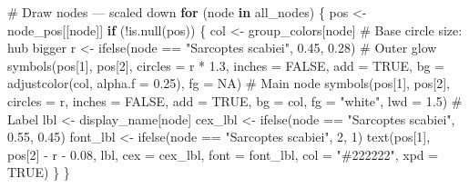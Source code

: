 \documentclass[
  letterpaper,
  DIV=11,
  numbers=noendperiod]{scrartcl}
\newenvironment{Shaded}{\begin{snugshade}}{\end{snugshade}}
\newcommand{\AttributeTok}[1]{\textcolor[rgb]{0.40,0.45,0.13}{#1}}
\newcommand{\CommentTok}[1]{\textcolor[rgb]{0.37,0.37,0.37}{#1}}
\newcommand{\ConstantTok}[1]{\textcolor[rgb]{0.56,0.35,0.01}{#1}}
\newcommand{\ControlFlowTok}[1]{\textcolor[rgb]{0.00,0.23,0.31}{\textbf{#1}}}
\newcommand{\DecValTok}[1]{\textcolor[rgb]{0.68,0.00,0.00}{#1}}
\newcommand{\FloatTok}[1]{\textcolor[rgb]{0.68,0.00,0.00}{#1}}
\newcommand{\FunctionTok}[1]{\textcolor[rgb]{0.28,0.35,0.67}{#1}}
\newcommand{\NormalTok}[1]{\textcolor[rgb]{0.00,0.23,0.31}{#1}}
\newcommand{\OtherTok}[1]{\textcolor[rgb]{0.00,0.23,0.31}{#1}}
\newcommand{\SpecialCharTok}[1]{\textcolor[rgb]{0.37,0.37,0.37}{#1}}
\newcommand{\StringTok}[1]{\textcolor[rgb]{0.13,0.47,0.30}{#1}}
\begin{document}
\begin{Shaded}
\begin{Highlighting}[]
\CommentTok{\# Draw nodes — scaled down}
\ControlFlowTok{for}\NormalTok{ (node }\ControlFlowTok{in}\NormalTok{ all\_nodes) \{}
\NormalTok{  pos }\OtherTok{\textless{}{-}}\NormalTok{ node\_pos[[node]]}
  \ControlFlowTok{if}\NormalTok{ (}\SpecialCharTok{!}\FunctionTok{is.null}\NormalTok{(pos)) \{}
\NormalTok{    col }\OtherTok{\textless{}{-}}\NormalTok{ group\_colors[node]}
    \CommentTok{\# Base circle size: hub bigger}
\NormalTok{    r }\OtherTok{\textless{}{-}} \FunctionTok{ifelse}\NormalTok{(node }\SpecialCharTok{==} \StringTok{"Sarcoptes scabiei"}\NormalTok{, }\FloatTok{0.45}\NormalTok{, }\FloatTok{0.28}\NormalTok{)}
    \CommentTok{\# Outer glow}
    \FunctionTok{symbols}\NormalTok{(pos[}\DecValTok{1}\NormalTok{], pos[}\DecValTok{2}\NormalTok{], }\AttributeTok{circles =}\NormalTok{ r }\SpecialCharTok{*} \FloatTok{1.3}\NormalTok{,}
            \AttributeTok{inches =} \ConstantTok{FALSE}\NormalTok{, }\AttributeTok{add =} \ConstantTok{TRUE}\NormalTok{,}
            \AttributeTok{bg =} \FunctionTok{adjustcolor}\NormalTok{(col, }\AttributeTok{alpha.f =} \FloatTok{0.25}\NormalTok{),}
            \AttributeTok{fg =} \ConstantTok{NA}\NormalTok{)}
    \CommentTok{\# Main node}
    \FunctionTok{symbols}\NormalTok{(pos[}\DecValTok{1}\NormalTok{], pos[}\DecValTok{2}\NormalTok{], }\AttributeTok{circles =}\NormalTok{ r,}
            \AttributeTok{inches =} \ConstantTok{FALSE}\NormalTok{, }\AttributeTok{add =} \ConstantTok{TRUE}\NormalTok{,}
            \AttributeTok{bg =}\NormalTok{ col,}
            \AttributeTok{fg =} \StringTok{"white"}\NormalTok{, }\AttributeTok{lwd =} \FloatTok{1.5}\NormalTok{)}
    \CommentTok{\# Label}
\NormalTok{    lbl }\OtherTok{\textless{}{-}}\NormalTok{ display\_name[node]}
\NormalTok{    cex\_lbl }\OtherTok{\textless{}{-}} \FunctionTok{ifelse}\NormalTok{(node }\SpecialCharTok{==} \StringTok{"Sarcoptes scabiei"}\NormalTok{, }\FloatTok{0.55}\NormalTok{, }\FloatTok{0.45}\NormalTok{)}
\NormalTok{    font\_lbl }\OtherTok{\textless{}{-}} \FunctionTok{ifelse}\NormalTok{(node }\SpecialCharTok{==} \StringTok{"Sarcoptes scabiei"}\NormalTok{, }\DecValTok{2}\NormalTok{, }\DecValTok{1}\NormalTok{)}
    \FunctionTok{text}\NormalTok{(pos[}\DecValTok{1}\NormalTok{], pos[}\DecValTok{2}\NormalTok{] }\SpecialCharTok{{-}}\NormalTok{ r }\SpecialCharTok{{-}} \FloatTok{0.08}\NormalTok{,}
\NormalTok{         lbl, }\AttributeTok{cex =}\NormalTok{ cex\_lbl, }\AttributeTok{font =}\NormalTok{ font\_lbl,}
         \AttributeTok{col =} \StringTok{"\#222222"}\NormalTok{, }\AttributeTok{xpd =} \ConstantTok{TRUE}\NormalTok{)}
\NormalTok{  \}}
\NormalTok{\}}


\end{Highlighting}
\end{Shaded}
\end{document}
